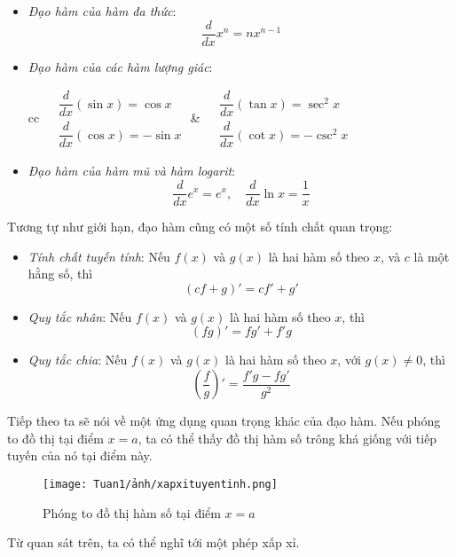 \begin{itemize}
\item\textit{Đạo hàm của hàm đa thức}:
\begin{equation}
    \frac{d}{dx}x^n=nx^{n-1}
\end{equation}
\item\textit{Đạo hàm của các hàm lượng giác}:
\begin{center}
\begin{tabular}{cc}
\(
\begin{aligned}
    &\dfrac{d}{dx}(\sin x)=\cos x\\
    &\dfrac{d}{dx}(\cos x)=-\sin x
\end{aligned}
\)
&
\(
\begin{aligned}
    &\dfrac{d}{dx}(\tan x)=\sec^2 x\\
    &\dfrac{d}{dx}(\cot x)=-\csc^2 x
\end{aligned}
\)
\end{tabular}
\end{center}
\item\textit{Đạo hàm của hàm mũ và hàm logarit}:
\begin{equation}
    \frac{d}{dx}e^x=e^x,\quad \frac{d}{dx}\ln x=\frac{1}{x}
\end{equation}
\end{itemize}

Tương tự như giới hạn, đạo hàm cũng có một số tính chất quan trọng:
\begin{itemize}
    \item \textit{Tính chất tuyến tính}: Nếu $f(x)$ và $g(x)$ là hai hàm số theo $x$, và $c$ là một hằng số, thì
    \begin{equation}
        (cf+g)'=cf'+g'
    \end{equation}
    \item \textit{Quy tắc nhân}: Nếu $f(x)$ và $g(x)$ là hai hàm số theo $x$, thì
    \begin{equation}
        (fg)'=fg'+f'g
    \end{equation}
    \item \textit{Quy tắc chia}: Nếu $f(x)$ và $g(x)$ là hai hàm số theo $x$, với $g(x)\neq 0$, thì
    \begin{equation}
        \left(\frac{f}{g}\right)'=\frac{f'g-fg'}{g^2}
    \end{equation}
\end{itemize}

Tiếp theo ta sẽ nói về một ứng dụng quan trọng khác của đạo hàm. Nếu phóng to đồ thị tại điểm $x=a$, ta có thể thấy đồ thị hàm số trông khá giống với tiếp tuyến của nó tại điểm này.
\begin{figure}[H]
\centering
\texttt{[image: Tuan1/ảnh/xapxituyentinh.png]}
\caption{Phóng to đồ thị hàm số tại điểm $x=a$}
\end{figure}
Từ quan sát trên, ta có thể nghĩ tới một phép xấp xỉ.

